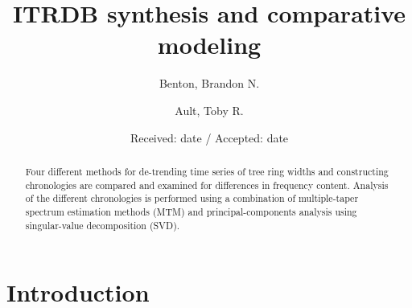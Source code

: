 \documentclass[smallextended]{svjour3}       %
\begin{document}
\title{ITRDB synthesis and comparative modeling} %


%



\author{Benton, Brandon N. \and Ault, Toby R.}




\date{Received: date / Accepted: date}

\maketitle

\begin{abstract}
Four different methods for de-trending time series of tree ring widths 
and constructing chronologies are compared and examined for 
differences in frequency content. Analysis of the different chronologies 
is performed using a combination of multiple-taper spectrum estimation 
methods (MTM) and principal-components analysis using singular-value 
decomposition (SVD). 

\end{abstract}

\section{Introduction}
\label{intro}
\end{document}
